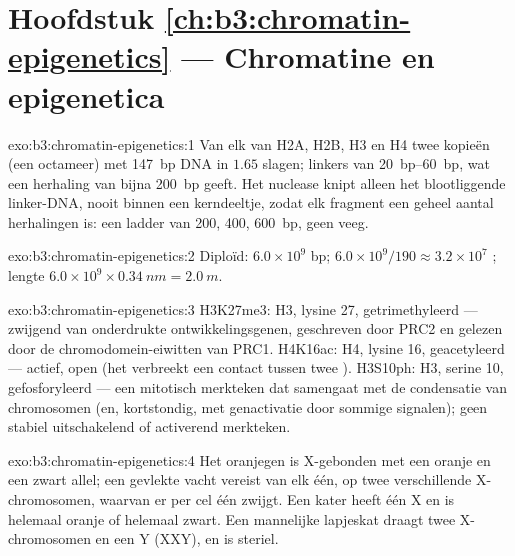 \section*{Hoofdstuk \ref{ch:b3:chromatin-epigenetics} --- Chromatine en epigenetica}

\begin{solution}{exo:b3:chromatin-epigenetics:1}
Van elk van H2A, H2B, H3 en H4 twee kopieën (een octameer) met
\qty{147}{bp} DNA in $1.65$ slagen; linkers van \qtyrange{20}{60}{bp},
wat een herhaling van bijna \qty{200}{bp} geeft. Het nuclease knipt
alleen het blootliggende linker-DNA, nooit binnen een kerndeeltje,
zodat elk fragment een geheel aantal herhalingen is: een ladder van
\num{200}, \num{400}, \qty{600}{bp}, geen veeg.
\end{solution}

\begin{solution}{exo:b3:chromatin-epigenetics:2}
Diploïd: $6.0\times 10^{9}$ bp; $6.0\times 10^{9}/190 \approx
3.2\times 10^{7}$ ; lengte $6.0\times 10^{9}\times
\qty{0.34}{nm} = \qty{2.0}{m}$.
\end{solution}

\begin{solution}{exo:b3:chromatin-epigenetics:3}
H3K27me3:  H3, lysine 27, getrimethyleerd --- zwijgend
 van onderdrukte ontwikkelingsgenen, geschreven door PRC2 en
gelezen door de chromodomein-eiwitten van PRC1. H4K16ac: H4, lysine
16, geacetyleerd --- actief, open  (het verbreekt een
contact tussen twee ). H3S10ph: H3, serine 10,
gefosforyleerd --- een mitotisch merkteken dat samengaat met de
condensatie van chromosomen (en, kortstondig, met genactivatie door
sommige signalen); geen stabiel uitschakelend of activerend merkteken.
\end{solution}

\begin{solution}{exo:b3:chromatin-epigenetics:4}
Het oranjegen is X-gebonden met een oranje en een zwart allel; een
gevlekte vacht vereist van elk één, op twee verschillende
X-chromosomen, waarvan er per cel één zwijgt. Een kater heeft één X en
is helemaal oranje of helemaal zwart. Een mannelijke lapjeskat draagt
twee X-chromosomen en een Y (XXY), en is steriel.
\end{solution}

